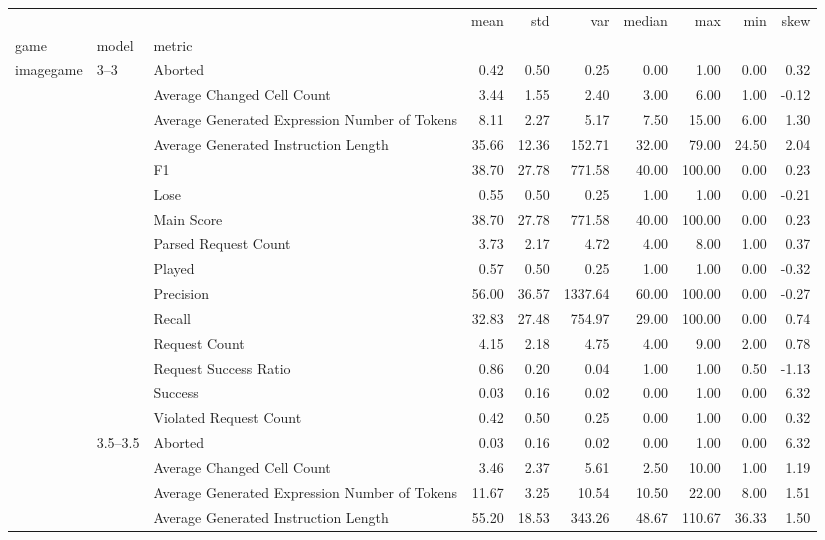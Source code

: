 \begin{tabular}{lllrrrrrrr}
\toprule
 &  &  & mean & std & var & median & max & min & skew \\
game & model & metric &  &  &  &  &  &  &  \\
\midrule
\multirow[t]{165}{*}{imagegame} & \multirow[t]{15}{*}{3--3} & Aborted & 0.42 & 0.50 & 0.25 & 0.00 & 1.00 & 0.00 & 0.32 \\
 &  & Average Changed Cell Count & 3.44 & 1.55 & 2.40 & 3.00 & 6.00 & 1.00 & -0.12 \\
 &  & Average Generated Expression Number of Tokens & 8.11 & 2.27 & 5.17 & 7.50 & 15.00 & 6.00 & 1.30 \\
 &  & Average Generated Instruction Length & 35.66 & 12.36 & 152.71 & 32.00 & 79.00 & 24.50 & 2.04 \\
 &  & F1 & 38.70 & 27.78 & 771.58 & 40.00 & 100.00 & 0.00 & 0.23 \\
 &  & Lose & 0.55 & 0.50 & 0.25 & 1.00 & 1.00 & 0.00 & -0.21 \\
 &  & Main Score & 38.70 & 27.78 & 771.58 & 40.00 & 100.00 & 0.00 & 0.23 \\
 &  & Parsed Request Count & 3.73 & 2.17 & 4.72 & 4.00 & 8.00 & 1.00 & 0.37 \\
 &  & Played & 0.57 & 0.50 & 0.25 & 1.00 & 1.00 & 0.00 & -0.32 \\
 &  & Precision & 56.00 & 36.57 & 1337.64 & 60.00 & 100.00 & 0.00 & -0.27 \\
 &  & Recall & 32.83 & 27.48 & 754.97 & 29.00 & 100.00 & 0.00 & 0.74 \\
 &  & Request Count & 4.15 & 2.18 & 4.75 & 4.00 & 9.00 & 2.00 & 0.78 \\
 &  & Request Success Ratio & 0.86 & 0.20 & 0.04 & 1.00 & 1.00 & 0.50 & -1.13 \\
 &  & Success & 0.03 & 0.16 & 0.02 & 0.00 & 1.00 & 0.00 & 6.32 \\
 &  & Violated Request Count & 0.42 & 0.50 & 0.25 & 0.00 & 1.00 & 0.00 & 0.32 \\
\cline{2-10}
 & \multirow[t]{15}{*}{3.5--3.5} & Aborted & 0.03 & 0.16 & 0.02 & 0.00 & 1.00 & 0.00 & 6.32 \\
 &  & Average Changed Cell Count & 3.46 & 2.37 & 5.61 & 2.50 & 10.00 & 1.00 & 1.19 \\
 &  & Average Generated Expression Number of Tokens & 11.67 & 3.25 & 10.54 & 10.50 & 22.00 & 8.00 & 1.51 \\
 &  & Average Generated Instruction Length & 55.20 & 18.53 & 343.26 & 48.67 & 110.67 & 36.33 & 1.50 \\

\end{tabular}
